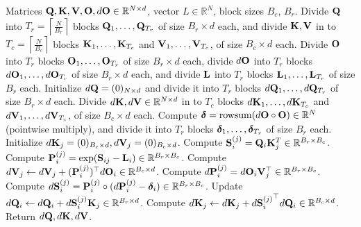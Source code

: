 \documentclass{article} %
\begin{document}
\begin{algorithm}[t]
  \caption{Flash Attention: Backward Pass}\label{alg:fa_backward}
  \begin{algorithmic}[1]
    \REQUIRE Matrices ${\mathbf{Q}}, {\mathbf{K}}, {\mathbf{V}}, {\mathbf{O}}, d{\mathbf{O}} \in \mathbb{R}^{N \times d}$,
    vector $L \in \mathbb{R}^N$, block sizes $B_c$, $B_r$.
    \STATE Divide ${\mathbf{Q}}$ into $T_r = \left\lceil\frac{N}{B_r} \right\rceil$ blocks ${\mathbf{Q}}_1, \dots, {\mathbf{Q}}_{T_r}$ of size $B_r \times d$ each,
    and divide ${\mathbf{K}}, {\mathbf{V}}$ in to $T_c = \left\lceil \frac{N}{B_c} \right\rceil$ blocks ${\mathbf{K}}_1, \dots, {\mathbf{K}}_{T_c}$ and
    ${\mathbf{V}}_1, \dots, {\mathbf{V}}_{T_c}$, of size $B_c \times d$ each.
    \STATE Divide ${\mathbf{O}}$ into $T_r$ blocks ${\mathbf{O}}_1, \dots, {\mathbf{O}}_{T_r}$ of size
    $B_r \times d$ each, divide $d{\mathbf{O}}$ into $T_r$ blocks $d{\mathbf{O}}_1, \dots, d{\mathbf{O}}_{T_r}$
    of size $B_r \times d$ each, and divide ${\mathbf{L}}$ into $T_r$ blocks ${\mathbf{L}}_1, \dots, {\mathbf{L}}_{T_r}$ of size
    $B_r$ each.
    \STATE Initialize $d{\mathbf{Q}} = (0)_{N \times d}$ and divide it into $T_r$ blocks $d{\mathbf{Q}}_1, \dots, d{\mathbf{Q}}_{T_r}$ of size $B_r \times d$ each.
    Divide $d{\mathbf{K}}, d{\mathbf{V}} \in \mathbb{R}^{N \times d}$ in to $T_c$ blocks $d{\mathbf{K}}_1, \dots, d{\mathbf{K}}_{T_c}$ and
    $d{\mathbf{V}}_1, \dots, d{\mathbf{V}}_{T_c}$, of size $B_c \times d$ each.
    \STATE Compute ${\boldsymbol{\delta}} = \mathrm{rowsum}(d{\mathbf{O}} \circ {\mathbf{O}}) \in \mathbb{R}^N$ (pointwise multiply), and divide it into $T_r$ blocks ${\boldsymbol{\delta}}_1, \dots, {\boldsymbol{\delta}}_{T_r}$ of size
    $B_r$ each.
      \STATE Initialize $d{\mathbf{K}}_j = (0)_{B_c \times d}, d{\mathbf{V}}_j = (0)_{B_c \times d}$.
        \STATE Compute ${\mathbf{S}}_{i}^{(j)} = {\mathbf{Q}}_i {\mathbf{K}}_j^T \in \mathbb{R}^{B_r \times B_c}$.
        \STATE Compute ${\mathbf{P}}_{i}^{(j)} = \exp({\mathbf{S}}_{ij} - {\mathbf{L}}_{i}) \in \mathbb{R}^{B_r \times B_c}$.
        \STATE Compute
        $d{\mathbf{V}}_j \leftarrow d{\mathbf{V}}_j + ({\mathbf{P}}_{i}^{(j)})^\top d{\mathbf{O}}_i \in \mathbb{R}^{B_c \times d}$.
        \STATE Compute
        $d{\mathbf{P}}_{i}^{(j)} = d{\mathbf{O}}_{i} {\mathbf{V}}_j^\top \in \mathbb{R}^{B_r \times B_c}$.
        \STATE Compute $d{\mathbf{S}}_{i}^{(j)} = {\mathbf{P}}_{i}^{(j)} \circ (d{\mathbf{P}}_{i}^{(j)} - {\boldsymbol{\delta}}_i) \in \mathbb{R}^{B_r \times B_c}$.
        \STATE Update $d{\mathbf{Q}}_{i} \leftarrow d{\mathbf{Q}}_i + d{\mathbf{S}}_{i}^{(j)} {\mathbf{K}}_j \in \mathbb{R}^{B_r \times d}$.
        \STATE Compute $d{\mathbf{K}}_{j} \leftarrow d{\mathbf{K}}_j + {d{\mathbf{S}}_{i}^{(j)}}^\top d{\mathbf{Q}}_i \in \mathbb{R}^{B_c \times d}$.
      \ENDFOR
    \ENDFOR
    \STATE Return $d{\mathbf{Q}}, d{\mathbf{K}}, d{\mathbf{V}}$.
  \end{algorithmic}
\end{algorithm}
\end{document}
